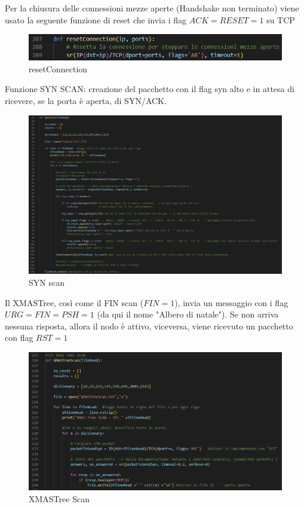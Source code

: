Per la chiusura delle connessioni mezze aperte (Handshake non terminato) viene usato la seguente funzione di reset che invia i flag $ACK=RESET=1$ su TCP
\begin{figure}[H]
    \centering
    \includegraphics[scale=0.7]{UNINA_MSc_Thesis_Project/img/Codice/resetConnection.png}
    \caption{resetConnection}
    \label{fig:my_label}
\end{figure}

Funzione SYN SCAN: creazione del pacchetto con il flag syn alto e in attesa di ricevere, se la porta è aperta, di SYN/ACK.
\begin{figure}[H]
    \centering
    \includegraphics[scale=0.3]{UNINA_MSc_Thesis_Project/img/Codice/SynScan.png}
    \caption{SYN scan}
    \label{fig:my_label}
\end{figure}

Il XMASTree, così come il FIN scan ($FIN=1$), invia un messaggio con i flag $URG=FIN=PSH=1$ (da qui il nome "Albero di natale"). Se non arriva nessuna risposta, allora il nodo è attivo, viceversa, viene ricevuto un pacchetto con flag $RST=1$

\begin{figure}[H]
    \centering
    \includegraphics[scale=0.4]{UNINA_MSc_Thesis_Project/img/Codice/XMASTree.png}
    \caption{XMASTree Scan}
    \label{fig:my_label}
\end{figure}


